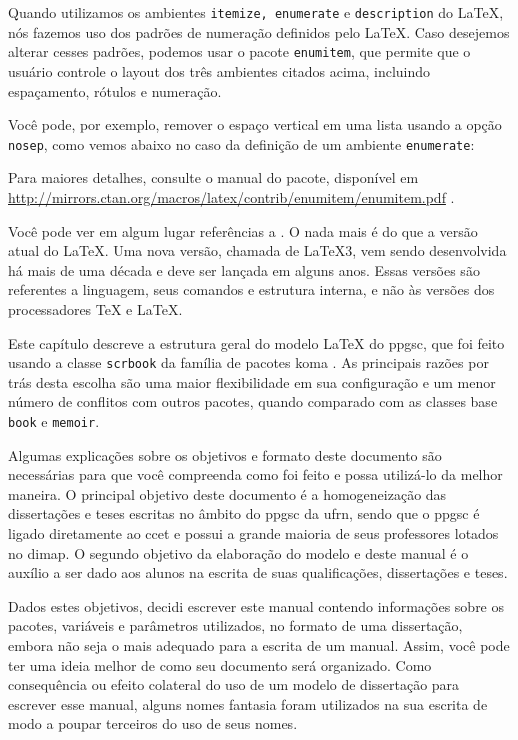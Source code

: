 Quando utilizamos os ambientes \texttt{itemize, enumerate} e  \texttt{description} do \LaTeX{}, nós fazemos uso dos padrões de numeração definidos pelo \LaTeX{}. Caso desejemos alterar cesses padrões, podemos usar o pacote \texttt{enumitem}, que permite que o usuário controle o layout dos três ambientes citados acima, incluindo espaçamento, rótulos e numeração.

Você pode, por exemplo, remover o espaço vertical em uma lista usando a opção \texttt{nosep}, como vemos abaixo no caso da definição de um ambiente \texttt{enumerate}: 


Para maiores detalhes, consulte o manual do pacote, disponível em
\url{http://mirrors.ctan.org/macros/latex/contrib/enumitem/enumitem.pdf} \parencite{enumitem}.

Você pode ver em algum lugar referências a \LaTeXe{}. O \LaTeXe{} nada mais é do que a versão atual do \LaTeX{}. Uma nova versão, chamada de \LaTeX{}3, vem sendo desenvolvida há mais de uma década e deve ser lançada em alguns anos. Essas versões são referentes a linguagem, seus comandos e estrutura interna, e não às versões dos processadores \TeX{} e \LaTeX{}.

Este capítulo descreve a estrutura geral do modelo \LaTeX{} do \gls{ppgsc}, que foi feito usando a classe \texttt{scrbook} da família de pacotes \gls{koma} \parencite{koma}. As principais razões por trás desta escolha são uma maior flexibilidade em sua configuração e um menor número de conflitos com outros pacotes, quando comparado com as classes base \texttt{book} e \texttt{memoir}. 

Algumas explicações sobre os objetivos e formato deste documento são necessárias para que você compreenda como foi feito e possa utilizá-lo da melhor maneira. O principal objetivo deste documento é a homogeneização das dissertações e teses escritas no âmbito do \gls{ppgsc} da \gls{ufrn}, sendo que o \gls{ppgsc} é ligado diretamente ao \gls{ccet} e possui a grande maioria de seus professores lotados no \gls{dimap}. O segundo objetivo da elaboração do modelo e deste manual é o auxílio a ser dado aos alunos na escrita de suas qualificações, dissertações e teses.

Dados estes objetivos, decidi escrever este manual contendo informações sobre os pacotes, variáveis e parâmetros utilizados, no formato de uma dissertação, embora não seja o mais adequado para a escrita de um manual. Assim, você pode ter uma ideia melhor de como seu documento será organizado. Como consequência ou efeito colateral do uso de um modelo de dissertação para escrever esse manual, alguns nomes fantasia foram utilizados na sua escrita de modo a poupar terceiros do uso de seus nomes.

